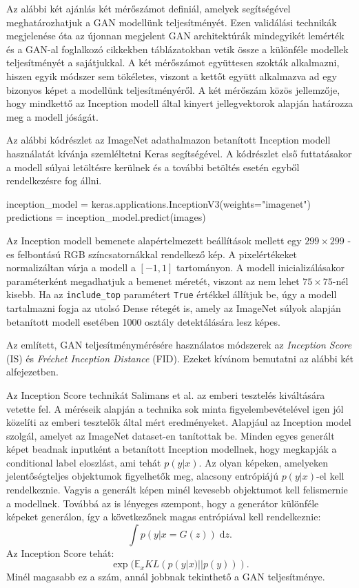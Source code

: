 Az alábbi két ajánlás két mérőszámot definiál, amelyek segítségével meghatározhatjuk a GAN modellünk teljesítményét. Ezen validálási technikák megjelenése óta az újonnan megjelent GAN architektúrák mindegyikét lemérték és a GAN-al foglalkozó cikkekben táblázatokban vetik össze a különféle modellek teljesítményét a sajátjukkal.
A két mérőszámot együttesen szokták alkalmazni, hiszen egyik módszer sem tökéletes, viszont a kettőt együtt alkalmazva ad egy bizonyos képet a modellünk teljesítményéről.
A két mérőszám közös jellemzője, hogy mindkettő az Inception modell által kinyert jellegvektorok alapján határozza meg a modell jóságát.

Az alábbi kódrészlet az ImageNet adathalmazon betanított Inception modell használatát kívánja szemléltetni Keras segítségével. A kódrészlet első futtatásakor a modell súlyai letöltésre kerülnek és a további betöltés esetén egyből rendelkezésre fog állni.

\begin{python}
inception_model = keras.applications.InceptionV3(weights="imagenet")
predictions = inception_model.predict(images)
\end{python}

Az Inception modell bemenete alapértelmezett beállítások mellett egy $299 \times 299$ -es felbontású RGB színcsatornákkal rendelkező kép. A pixelértékeket normalizáltan várja a modell a $[-1, 1]$ tartományon. A modell inicializálásakor paraméterként megadhatjuk a bemenet méretét, viszont az nem lehet $75 \times 75$-nél kisebb. Ha az \texttt{include\_top} paramétert \texttt{True} értékkel állítjuk be, úgy a modell tartalmazni fogja az utolsó Dense rétegét is, amely az ImageNet súlyok alapján betanított modell esetében 1000 osztály detektálására lesz képes.

Az említett, GAN teljesítménymérésére használatos módszerek az \textit{Inception Score} (IS) és \textit{Fréchet Inception Distance} (FID). Ezeket kívánom bemutatni az alábbi két alfejezetben.

Az Inception Score \cite{salimans2016improved} technikát Salimans et al. az emberi tesztelés kiváltására vetette fel. A méréseik alapján a technika sok minta figyelembevételével igen jól közelíti az emberi tesztelők által mért eredményeket.
Alapjául az Inception model szolgál, amelyet az ImageNet dataset-en tanítottak be. Minden egyes generált képet beadnak inputként a betanított Inception modellnek, hogy megkapják a conditional label eloszlást, ami tehát $p(y|x)$. Az olyan képeken, amelyeken jelentőségteljes objektumok figyelhetők meg, alacsony entrópiájú $p(y|x)$-el kell rendelkeznie. Vagyis a generált képen minél kevesebb objektumot kell felismernie a modellnek.
Továbbá az is lényeges szempont, hogy a generátor különféle képeket generálon, így a következőnek magas entrópiával kell rendelkeznie:
$$ \int \! p(y|x = G(z)) \; \mathrm{d}z. $$
Az Inception Score tehát:
$$ \exp(\mathbb{E}_x KL(p(y|x)||p(y))).$$
Minél magasabb ez a szám, annál jobbnak tekinthető a GAN teljesítménye.

